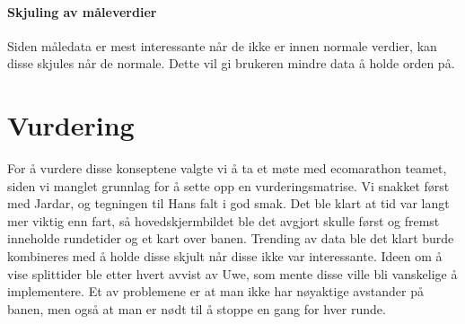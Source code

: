 \paragraph{Skjuling av måleverdier}
Siden måledata er mest interessante når de ikke er innen normale verdier, kan disse skjules når de normale.
Dette vil gi brukeren mindre data å holde orden på.

\section{Vurdering}
For å vurdere disse konseptene valgte vi å ta et møte med ecomarathon teamet, siden vi manglet grunnlag for å sette opp en vurderingsmatrise. 
Vi snakket først med Jardar, og tegningen til Hans falt i god smak. 
Det ble klart at tid var langt mer viktig enn fart, så hovedskjermbildet ble det avgjort skulle først og fremst inneholde rundetider og et kart over banen. 
Trending av data ble det klart burde kombineres med å holde disse skjult når disse ikke var interessante.
Ideen om å vise splittider ble etter hvert avvist av Uwe, som mente disse ville bli vanskelige å implementere. 
Et av problemene er at man ikke har nøyaktige avstander på banen, men også at man er nødt til å stoppe en gang for hver runde.
